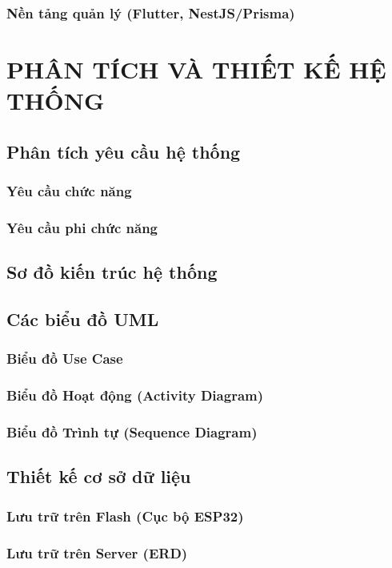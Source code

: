 \documentclass[12pt,a4paper]{report}
\begin{document}
    \subsection{Nền tảng quản lý (Flutter, NestJS/Prisma)}

    \chapter{PHÂN TÍCH VÀ THIẾT KẾ HỆ THỐNG}
    \section{Phân tích yêu cầu hệ thống}
    \subsection{Yêu cầu chức năng}
    \subsection{Yêu cầu phi chức năng}

    \section{Sơ đồ kiến trúc hệ thống}
    \section{Các biểu đồ UML}
    \subsection{Biểu đồ Use Case}
    \subsection{Biểu đồ Hoạt động (Activity Diagram)}
    \subsection{Biểu đồ Trình tự (Sequence Diagram)}

    \section{Thiết kế cơ sở dữ liệu}
    \subsection{Lưu trữ trên Flash (Cục bộ ESP32)}
    \subsection{Lưu trữ trên Server (ERD)}
\end{document}
